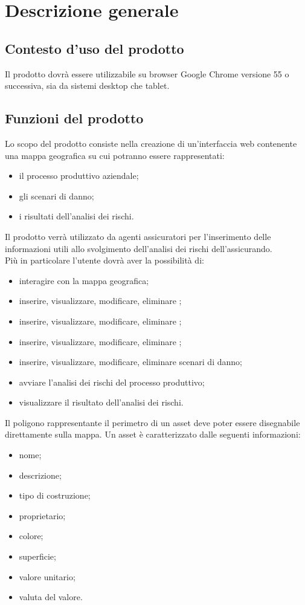 \section{Descrizione generale}
\subsection{Contesto d'uso del prodotto}
Il prodotto dovrà essere utilizzabile su browser Google Chrome versione 55 o successiva, sia da sistemi desktop che tablet.
\subsection{Funzioni del prodotto}
	Lo scopo del prodotto consiste nella creazione di un'interfaccia web contenente una mappa geografica su cui potranno essere rappresentati:
	\begin{itemize}
		\item il processo produttivo aziendale;
		\item gli scenari di danno;
		\item i risultati dell'analisi dei rischi.
	\end{itemize}
	Il prodotto verrà utilizzato da agenti assicuratori per l'inserimento delle informazioni utili allo svolgimento dell'analisi dei rischi dell'assicurando.\\
	Più in particolare l'utente dovrà aver la possibilità di:
	\begin{itemize}
        \item interagire con la mappa geografica;
		\item inserire, visualizzare, modificare, eliminare ;
		\item inserire, visualizzare, modificare, eliminare ;
		\item inserire, visualizzare, modificare, eliminare ;
		\item inserire, visualizzare, modificare, eliminare scenari di danno;
		\item avviare l'analisi dei rischi del processo produttivo;
		\item visualizzare il risultato dell'analisi dei rischi.
	\end{itemize}
	Il poligono rappresentante il perimetro di un asset deve poter essere disegnabile direttamente sulla mappa. Un asset è caratterizzato dalle seguenti informazioni:
		\begin{itemize}
			\item nome;
			\item descrizione;
			\item tipo di costruzione;
			\item proprietario;
			\item colore;
			\item superficie;
			\item valore unitario;
			\item valuta del valore.
		\end{itemize}
